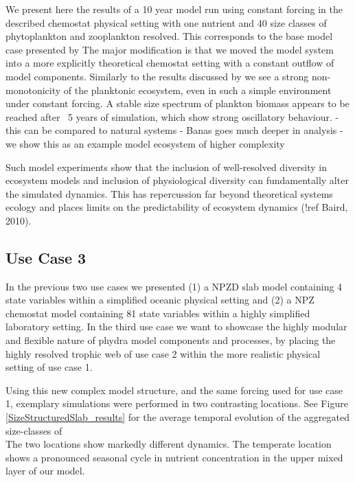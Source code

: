 \documentclass[template.tex]{subfiles}
\begin{document}
We present here the results of a 10 year model run using constant forcing in the described chemostat physical setting with one nutrient and 40 size classes of phytoplankton and zooplankton resolved. This corresponds to the base model case presented by \cite{Banas2011b} The major modification is that we moved the model system into a more explicitly theoretical chemostat setting with a constant outflow of model components. Similarly to the results discussed by \cite{Banas2011b} we see a strong non-monotonicity of the planktonic ecosystem, even in such a simple environment under constant forcing. A stable size spectrum of plankton biomass appears to be reached after ~5 years of simulation, which show strong oscillatory behaviour. 
- this can be compared to natural systems
- Banas goes much deeper in analysis
- we show this as an example model ecosystem of higher complexity

Such model experiments show that the inclusion of well-resolved diversity in ecosystem models and inclusion of physiological diversity can fundamentally alter the simulated dynamics. This has repercussion far beyond theoretical systems ecology and places limits on the predictability of ecosystem dynamics (!ref Baird, 2010).


\subsection{Use Case 3}
In the previous two use cases we presented (1) a NPZD slab model containing 4 state variables within a simplified oceanic physical setting and (2) a NPZ chemostat model containing 81 state variables within a highly simplified laboratory setting. 
In the third use case we want to showcase the highly modular and flexible nature of phydra model components and processes, by placing the highly resolved trophic web of use case 2 within the more realistic physical setting of use case 1.

Using this new complex model structure, and the same forcing used for use case 1, exemplary simulations were performed in two contrasting locations. 
See Figure \ref{SizeStructuredSlab_results} for the average temporal evolution of the aggregated size-classes of \\

The two locations show markedly different dynamics. The temperate location shows a pronounced seasonal cycle in nutrient concentration in the upper mixed layer of our model. \\
\end{document}
